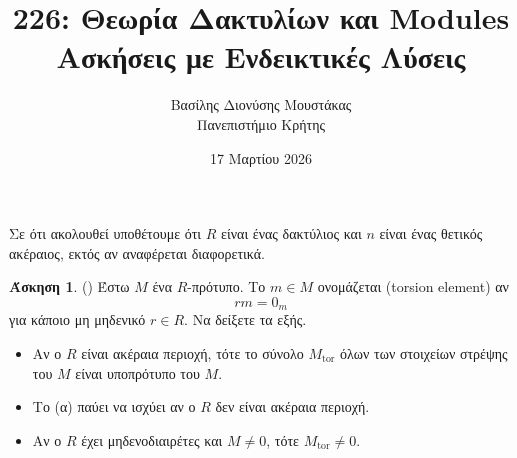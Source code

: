 \documentclass[12pt,a4paper,reqno]{amsart}
\title{226: Θεωρία Δακτυλίων και Modules \\ Ασκήσεις με Ενδεικτικές Λύσεις}
\author[Β.~Δ. Μουστακας]{Βασίλης Διονύσης Μουστάκας \\ Πανεπιστήμιο Κρήτης}
\date{17 Μαρτίου 2026}
\theoremstyle{definition}
\newtheorem{exercise}{Άσκηση}
\newcommand{\tor}{\mathrm{tor}}
\newcommand{\defn}[1]{{\color{mylightblue}{#1}}}
\begin{document}
\begingroup
\def\uppercasenonmath#1{} %
\let\MakeUppercase\relax %
\maketitle
\endgroup

\setcounter{exercise}{15}
\setcounter{equation}{3}
\renewcommand{\thesubsection}{\thesection.\arabic{subsection}}

Σε ότι ακολουθεί υποθέτουμε ότι $R$ είναι ένας δακτύλιος και $n$ είναι ένας θετικός ακέραιος, εκτός αν αναφέρεται διαφορετικά.

\begin{exercise}{\rm(\cite[Άσκηση~10.1.8]{DF04})}
  \label{ex:DF_10.1.8}
  Έστω $Μ$ ένα $R$-πρότυπο. Το $m \in M$ ονομάζεται \defn{στοιχείο στρέψης} (torsion element) αν 
  \[
  rm = 0_m
  \]
  για κάποιο μη μηδενικό $r \in R$. Να δείξετε τα εξής.
  \begin{itemize}
    \item[(α)] Αν ο $R$ είναι ακέραια περιοχή, τότε το σύνολο $M_{\tor}$ όλων των στοιχείων στρέψης του $M$ είναι υποπρότυπο του $M$.
    \item[(β)] Το (α) παύει να ισχύει αν ο $R$ δεν είναι ακέραια περιοχή.
    \item[(γ)] Αν ο $R$ έχει μηδενοδιαιρέτες και $M \neq 0$, τότε $M_\tor \neq 0$.
  \end{itemize}
\end{exercise}
\end{document}
